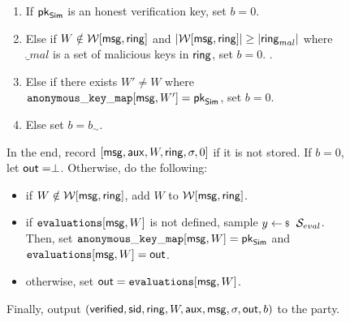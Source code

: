 \begin{figure}
\begin{tcolorbox}[left=2pt,right=2pt]
{\begin{list}{\hspace*{1pt} C}{\setlength\leftmargin{0.15in}}
					\begin{enumerate}
						\item If   $ \mathsf{pk}_{\mathsf{Sim}} $ is an honest verification key, set $ b = 0 $. 
						\label{cond:forgery}
						
						\item Else if $ W \notin \mathcal{W}[\mathsf{msg},\mathsf{ring}] $ and $ |\mathcal{W}[\mathsf{msg}, \mathsf{ring}]| \geq |\mathsf{ring}_{mal}| $ where $ \ring_{mal} $ is a set of malicious keys in $ \mathsf{ring} $, set $ b = 0 $.
						\label{cond:uniqueness}.
						
						\item Else if there exists $ W' \neq W $ where  $ \mathtt{anonymous\_key\_map}[\mathsf{msg},W'] = \mathsf{pk}_{\mathsf{Sim}} $, set $ b = 0 $. \label{cond:differentWforsamepk} 
						\item Else set $ b = b_\sim$. \label{cond:simulatorbit}
					\end{enumerate}		
					
				\end{list}
				In the end,  record $ [\mathsf{msg},\mathsf{aux},W,\mathsf{ring},\sigma, 0] $ if it is not stored. If $ b = 0 $, let ${\mathsf{out}}= \perp $. Otherwise,   do the following:
				\begin{itemize}
					\item if $ W \notin \mathcal{W}[\mathsf{msg},\mathsf{ring}] $, add $ W $ to $ \mathcal{W}[\mathsf{msg},\mathsf{ring}]  $.
					\item if $ \texttt{evaluations}[\mathsf{msg},W] $ is not defined, sample $ y \leftsample \setsym{S}_{eval}$. Then, set $ \mathtt{anonymous\_key\_map}[\mathsf{msg},W]  = \mathsf{pk}_{\mathsf{Sim}}$ and $ \texttt{evaluations}[\mathsf{msg}, W] = {\mathsf{out}}$.
					\item otherwise, set $ {\mathsf{out}} = \texttt{evaluations}[\mathsf{msg}, W]$. 	
				\end{itemize}
				Finally, output $(\mathsf{verified}, \textsf{sid}, \mathsf{ring},W, \mathsf{aux},\mathsf{msg}, \sigma, {\mathsf{out}}, b)$ to the party.
				
}
\end{tcolorbox}
\end{figure}
